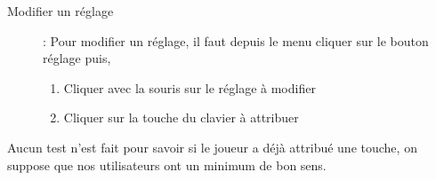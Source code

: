\documentclass[12pt]{article}
\begin{document}
\begin{description}
    \item[Modifier un réglage] : Pour modifier un réglage, il faut depuis le menu cliquer sur le bouton réglage puis,
    \begin{enumerate}
        \item Cliquer avec la souris sur le réglage à modifier
        \item Cliquer sur la touche du clavier à attribuer
    \end{enumerate}
\end{description}

Aucun test n'est fait pour savoir si le joueur a déjà attribué une touche, on suppose que nos utilisateurs ont un minimum de bon sens.
\end{document}
